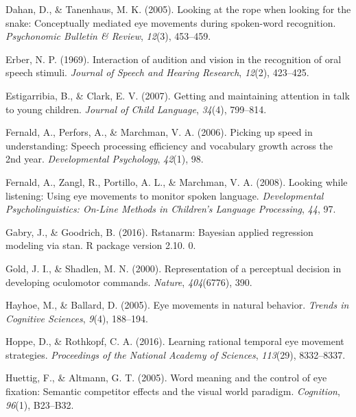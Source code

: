 \documentclass[english,floatsintext,man]{apa6}
\begin{document}
\leavevmode\hypertarget{ref-dahan2005looking}{}%
Dahan, D., \& Tanenhaus, M. K. (2005). Looking at the rope when looking
for the snake: Conceptually mediated eye movements during spoken-word
recognition. \emph{Psychonomic Bulletin \& Review}, \emph{12}(3),
453--459.

\leavevmode\hypertarget{ref-erber1969interaction}{}%
Erber, N. P. (1969). Interaction of audition and vision in the
recognition of oral speech stimuli. \emph{Journal of Speech and Hearing
Research}, \emph{12}(2), 423--425.

\leavevmode\hypertarget{ref-estigarribia2007getting}{}%
Estigarribia, B., \& Clark, E. V. (2007). Getting and maintaining
attention in talk to young children. \emph{Journal of Child Language},
\emph{34}(4), 799--814.

\leavevmode\hypertarget{ref-fernald2006picking}{}%
Fernald, A., Perfors, A., \& Marchman, V. A. (2006). Picking up speed in
understanding: Speech processing efficiency and vocabulary growth across
the 2nd year. \emph{Developmental Psychology}, \emph{42}(1), 98.

\leavevmode\hypertarget{ref-fernald2008looking}{}%
Fernald, A., Zangl, R., Portillo, A. L., \& Marchman, V. A. (2008).
Looking while listening: Using eye movements to monitor spoken language.
\emph{Developmental Psycholinguistics: On-Line Methods in Children's
Language Processing}, \emph{44}, 97.

\leavevmode\hypertarget{ref-gabry2016rstanarm}{}%
Gabry, J., \& Goodrich, B. (2016). Rstanarm: Bayesian applied regression
modeling via stan. R package version 2.10. 0.

\leavevmode\hypertarget{ref-gold2000representation}{}%
Gold, J. I., \& Shadlen, M. N. (2000). Representation of a perceptual
decision in developing oculomotor commands. \emph{Nature},
\emph{404}(6776), 390.

\leavevmode\hypertarget{ref-hayhoe2005eye}{}%
Hayhoe, M., \& Ballard, D. (2005). Eye movements in natural behavior.
\emph{Trends in Cognitive Sciences}, \emph{9}(4), 188--194.

\leavevmode\hypertarget{ref-hoppe2016learning}{}%
Hoppe, D., \& Rothkopf, C. A. (2016). Learning rational temporal eye
movement strategies. \emph{Proceedings of the National Academy of
Sciences}, \emph{113}(29), 8332--8337.

\leavevmode\hypertarget{ref-huettig2005word}{}%
Huettig, F., \& Altmann, G. T. (2005). Word meaning and the control of
eye fixation: Semantic competitor effects and the visual world paradigm.
\emph{Cognition}, \emph{96}(1), B23--B32.
\end{document}
